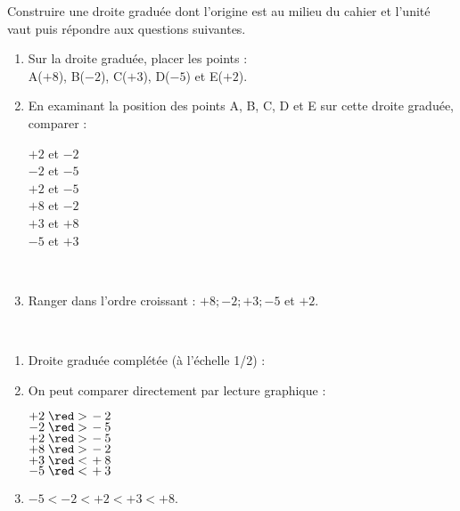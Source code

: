 \begin{exercice*}
    Construire une droite graduée dont l'origine est au milieu du cahier et l'unité vaut  puis répondre aux questions suivantes.
    \begin{enumerate}
       \item Sur la droite graduée, placer les points : \\
          A($+8$), B($-2$), C($+3$), D($-5$) et E($+2$).
       \item En examinant la position des points A, B, C, D et E sur cette droite graduée, comparer : \\ [-9mm]
          \begin{multicols}{3}
             $+2$ et $-2$ \\ \smallskip
             $-2$ et $-5$ \\ \smallskip
             $+2$ et $-5$ \\
             $+8$ et $-2$ \\
             $+3$ et $+8$ \\
             $-5$ et $+3$
          \end{multicols}
          \ \\ [-15mm]
       \item Ranger dans l'ordre croissant : $+8 ; -2 ; +3 ; -5$ et $+2$.
    \end{enumerate}
 \end{exercice*}
 
 \begin{corrige}
    \ \\ [-5mm]
    \begin{enumerate}
       \item Droite graduée complétée (à l'échelle 1/2) : \\ [2mm]
       \hspace*{-10mm} 
       \item On peut comparer directement par lecture graphique :
          \begin{multicols}{3}
             $+2 \; {\red >} \, -2$ \\ \smallskip
             $-2  \; {\red >} \, -5$ \\ \smallskip
             $+2 \; {\red >} \, -5$ \\
             $+8 \; {\red >} \, -2$ \\
             $+3 \; {\red <} \, +8$ \\
             $-5 \; {\red <} \, +3$
          \end{multicols}
          \vspace*{-3mm}
       \item \red$-5<-2<+2<+3<+8$.
    \end{enumerate}
 \end{corrige}